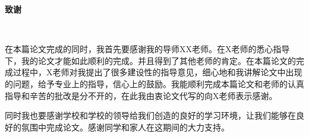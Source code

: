 
\begin{center}
	\bf\xiaosanhao 致\quad 谢
\end{center}
~

{\rm\wuhao 
	
在本篇论文完成的同时，我首先要感谢我的导师XX老师。在X老师的悉心指导下，我的论文才能如此顺利的完成。并且得到了其他老师的肯定。在本篇论文的完成过程中，X老师对我提出了很多建设性的指导意见，细心地和我讲解论文中出现的问题，给予专业上的指导，信心上的鼓励。我能顺利完成本篇论文和老师的认真指导和辛苦的批改是分不开的，在此我由衷论文代写的向X老师表示感谢。

同时我也要感谢学校和学校的领导给我们创造的良好的学习环境，让我们能够在良好的氛围中完成论文。感谢同学和家人在这期间的大力支持。

~

~



}